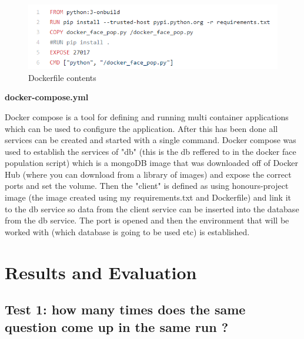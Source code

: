 \documentclass[12pt,a4paper]{article}
\begin{document}
\begin{figure}[!ht]
    \centering
    \includegraphics[width=1.0\textwidth]{Figs/Dockerfile.PNG} 
    \caption{Dockerfile contents} 
    \label{Dockerfile}
\end{figure}  

\textbf{docker-compose.yml} 

Docker compose is a tool for defining and running multi container applications which can be used to configure the application. After this has been done all services can be created and started with a single command. Docker compose was used to establish the services of "db" (this is the db reffered to in the docker face population script) which is a mongoDB image that was downloaded off of Docker Hub (where you can download from a library of images) and expose the correct ports and set the volume. Then the "client" is defined as using honours-project image (the image created using my requirements.txt and Dockerfile) and link it to the db service so data from the client service can be inserted into the database from the db service. The port is opened and then the environment that will be worked with (which database is going to be used etc) is established.

\newpage
\section{Results and Evaluation} 
\subsection{Test 1: how many times does the same question come up in the same run ?}  
\end{document}
